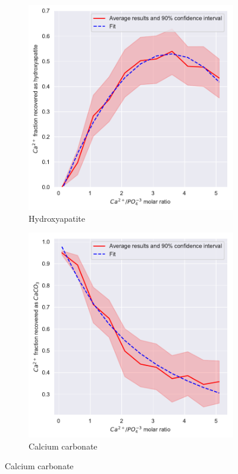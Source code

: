 \begin{refsection}[referencesCh3]
\begin{figure}[h]
\begin{subfigure}[t]{0.25\textheight}
		\includegraphics[width=\textwidth]{gfx/AppendixB/x_plotHAPYield_Ca} 
		\caption{Hydroxyapatite}
		\label{fig:estimation_Ca_HAP}
	\end{subfigure} 
	\begin{subfigure}[t]{0.25\textheight}
		\includegraphics[width=\textwidth]{gfx/AppendixB/x_plotCaCO3Yield_Ca}
		\caption{Calcium carbonate}
		\label{fig:estimation_Ca_CaCO3}
	\end{subfigure}
	

\end{figure}
\end{refsection}
